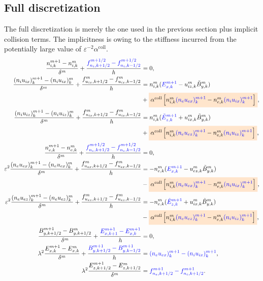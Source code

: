 \documentclass{report}
\begin{document}
\subsection{Full discretization}
The full discretization is merely the one used in the previous section plus implicit collision terms. The implicitness is owing to the stiffness incurred from the potentially large value of $\varepsilon^{-2}\alpha^\text{coll}$.
\begin{align*}
    \frac{n^{m+1}_{i,k} - n^m_{i,k}}{\delta^m} + \frac{\textcolor{blue}{f^{m+1/2}_{n_i,k+1/2} - f^{m+1/2}_{n_i,k-1/2}}}{h} &= 0, \\
    \frac{(n_iu_{ix})^{m+1}_k - (n_iu_{ix})^m_k}{\delta^m} + \frac{f^{m}_{u_{ix},k+1/2} - f^{m}_{u_{ix},k-1/2}}{h} &= n^m_{i,k}( \textcolor{blue}{E^{m+1}_{x,k}} - u^m_{iz,k}\Tilde{B}^m_{y,k}) \\
    & + \colorbox{orange!20}{$\alpha^\text{coll} \left[n^m_{i,k}\textcolor{blue}{(n_eu_{ex})^{m+1}_k} - n^m_{e,k}\textcolor{blue}{(n_iu_{ix})^{m+1}_k}\right]$},\\
    \frac{(n_iu_{iz})^{m+1}_k - (n_iu_{iz})^m_k}{\delta^m} + \frac{f^{m}_{u_{iz},k+1/2} - f^{m}_{u_{iz},k-1/2}}{h} &= n^m_{i,k}(\textcolor{blue}{\Tilde{E}^{m+1}_{z,k}} + u^m_{ix,k}\Tilde{B}^m_{y,k}) \\
    & + \colorbox{orange!20}{$\alpha^\text{coll} \left[n^m_{i,k}\textcolor{blue}{(n_eu_{ez})^{m+1}_k} - n^m_{e,k}\textcolor{blue}{(n_iu_{iz})^{m+1}_k}\right]$},\\
    \frac{n^{m+1}_{e,k} - n^m_{e,k}}{\delta^m} + \frac{\textcolor{blue}{f^{m+1/2}_{n_e,k+1/2} - f^{m+1/2}_{n_e,k-1/2}}}{h} &= 0,  \\
    \varepsilon^2\frac{(n_eu_{ex})^{m+1}_k - (n_eu_{ex})^m_k}{\delta^m} + \frac{f^{m}_{u_{ex},k+1/2} - f^{m}_{u_{ex},k-1/2}}{h} &= - n^m_{e,k}( \textcolor{blue}{E^{m+1}_{x,k}} - u^m_{ez,k}\Tilde{B}^m_{y,k}) \\
    & - \colorbox{orange!20}{$\alpha^\text{coll} \left[n^m_{i,k}\textcolor{blue}{(n_eu_{ex})^{m+1}_k} - n^m_{e,k}\textcolor{blue}{(n_iu_{ix})^{m+1}_k}\right]$},\\
    \varepsilon^2\frac{(n_eu_{ez})^{m+1}_k - (n_eu_{ez})^m_k}{\delta^m} + \frac{f^{m}_{u_{ez},k+1/2} - f^{m}_{u_{ez},k-1/2}}{h} &= - n^m_{e,k}(\textcolor{blue}{\Tilde{E}^{m+1}_{z,k}} + u^m_{ix,k}\Tilde{B}^m_{y,k}) \\
    & - \colorbox{orange!20}{$\alpha^\text{coll} \left[n^m_{i,k}\textcolor{blue}{(n_eu_{ez})^{m+1}_k} - n^m_{e,k}\textcolor{blue}{(n_iu_{iz})^{m+1}_k}\right]$},\\    
    \frac{B^{m+1}_{y,k+1/2} - B^{m}_{y,k+1/2}}{\delta^m} + \frac{\textcolor{blue}{E^{m+1}_{x,k+1} - E^{m+1}_{x,k}}}{h} &= 0, \\
    \lambda^2 \frac{E^{m+1}_{x,k} - E^{m}_{x,k}}{\delta^m} + \frac{\textcolor{blue}{B^{m+1}_{y,k+1/2} - B^{m+1}_{y,k-1/2}}}{h} &= \textcolor{blue}{(n_eu_{ex})^{m+1}_k - (n_iu_{ix})^{m+1}_k}, \\
    \lambda^2 \frac{E^{m+1}_{z,k+1/2} - E^{m}_{z,k+1/2}}{\delta^m} &= \textcolor{blue}{f^{m+1}_{n_e,k+1/2} - f^{m+1}_{n_i,k+1/2}}. \\
\end{align*}
\end{document}
